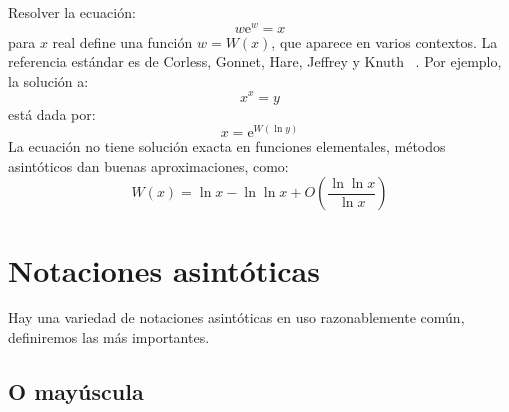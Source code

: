   Resolver la ecuación:
  \begin{equation*}
    w \mathrm{e}^w
      = x
  \end{equation*}
  para \(x\) real
  define una función \(w = W(x)\),
  que aparece en varios contextos.
  La referencia estándar es de Corless, Gonnet, Hare, Jeffrey y Knuth~%
    \cite{corless96:_Lambert_W_function}.
  Por ejemplo,
  la solución a:
  \begin{equation*}
    x^x
      = y
  \end{equation*}
  está dada por:
  \begin{equation*}
    x
      = \mathrm{e}^{W(\ln y)}
  \end{equation*}
  La ecuación no tiene solución exacta en funciones elementales,
  métodos asintóticos dan buenas aproximaciones,
  como:
  \begin{equation*}
    W(x)
      = \ln x - \ln \ln x + O\left( \frac{\ln \ln x}{\ln x} \right)
  \end{equation*}

\section{Notaciones asintóticas}
\label{sec:asymptotic-notations}

  Hay una variedad de notaciones asintóticas en uso razonablemente común,
  definiremos las más importantes.

\subsection{O mayúscula}
\label{sec:big-oh}

